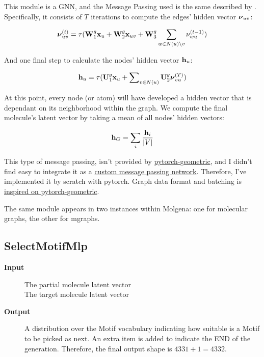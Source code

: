 \documentclass{article}
\begin{document}
This module is a GNN, and the Message Passing used is the same described by \cite{jtvae2019}.
Specifically, it consists of $T$ iterations to compute the edges' hidden vector $\boldsymbol\nu_{uv}$:

\begin{equation}
    \boldsymbol\nu_{uv}^{(t)} = \tau(\mathbf{W}_1^g \mathbf{x}_u + \mathbf{W}_2^g \mathbf{x}_{uv} + \mathbf{W}_3^g \sum_{w \in N(u) \backslash v} \nu_{wu}^{(t-1)})
\end{equation}

And one final step to calculate the nodes' hidden vector $\mathbf{h}_u$:

\begin{equation}
    \mathbf{h}_u = \tau(\mathbf{U}_1^g \mathbf{x}_u + \sum\nolimits_{v \in N(u)} \mathbf{U}_2^g \boldsymbol\nu_{vu}^{(T)})
\end{equation}

At this point, every node (or atom) will have developed a hidden vector that is dependant on its neighborhood within the graph.
We compute the final molecule's latent vector by taking a mean of all nodes' hidden vectors:

\begin{equation}
    \mathbf{h}_G = \sum_i \frac{\mathbf{h}_i}{\vert V \vert}
\end{equation}

This type of message passing, isn't provided by \href{https://pytorch-geometric.readthedocs.io/en/latest/}{pytorch-geometric},
and I didn't find easy to integrate it as a \href{https://pytorch-geometric.readthedocs.io/en/latest/notes/create_gnn.html}{custom message passing network}.
Therefore, I've implemented it by scratch with pytorch. Graph data format and batching is \href{https://pytorch-geometric.readthedocs.io/en/latest/advanced/batching.html}{inspired on pytorch-geometric}.

The same module appears in two instances within Molgena: one for molecular graphs, the other for mgraphs.


\subsection{SelectMotifMlp}

\begin{description}
\item[\textbf{Input}]
    The partial molecule latent vector\\
    The target molecule latent vector
\item[\textbf{Output}]
    A distribution over the Motif vocabulary indicating how suitable is a Motif to be picked as next.
    An extra item is added to indicate the END of the generation.
    Therefore, the final output shape is $4331 + 1 = 4332$.
\end{description}
\end{document}
